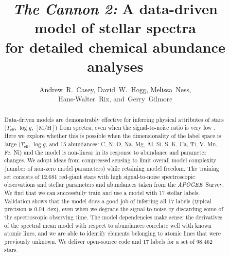 \documentclass[12pt,preprint]{aastex}
\newcommand{\project}[1]{\textsl{#1}}
\newcommand{\acronym}[1]{{\small{#1}}}
\newcommand{\apogee}{\project{\acronym{APOGEE}}}
\newcommand{\logg}{\log g}
\newcommand{\mh}{\mathrm{[M/H]}}
\newcommand{\Teff}{T_{\mathrm{eff}}}
\begin{document}
\title{\textsl{The Cannon 2:} A data-driven model of stellar spectra \\
       for detailed chemical abundance analyses}
\author{Andrew~R.~Casey,
        David~W.~Hogg,
        Melissa~Ness,\\
        Hans-Walter~Rix,
    and~Gerry~Gilmore}


\begin{abstract}
Data-driven models are demonstrably effective for inferring physical attributes
of stars ($\Teff$, $\logg$, $\mh$) from spectra, even when the signal-to-noise 
ratio is very low \citep{tc}.
Here we explore whether this is possible when the dimensionality of the label
space is large ($\Teff$, $\logg$, and 15 abundances: C, N, O, Na, Mg, Al, Si, S, 
K, Ca, Ti, V, Mn, Fe, Ni) and the model is non-linear in its response to 
abundance and parameter changes.
We adopt ideas from compressed sensing to limit overall model complexity (number
of non-zero model parameters) while retaining model freedom.  The training set 
consists of 12,681 red-giant stars with high signal-to-noise spectroscopic 
observations and stellar parameters and abundances taken from the \apogee\ 
Survey.
We find that we can successfully train and use a model with 17 stellar labels.
Validation shows that the model does a good job of inferring all 17 labels 
(typical precision is 0.04~dex), even when we degrade the signal-to-noise by 
discarding some of the spectroscopic observing time.  The model dependencies 
make sense: the derivatives of the spectral mean model with respect to 
abundances correlate well with known atomic lines, and we are able to identify 
elements belonging to atomic lines that were previously unknown.  We deliver 
open-source code and 17 labels for a set of 98,462 stars.
\end{abstract}
\end{document}
